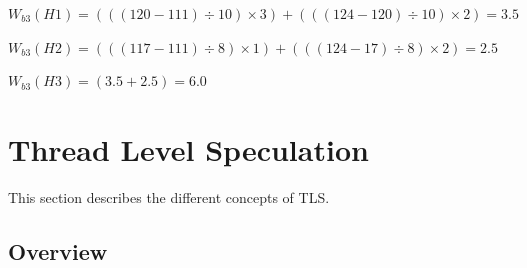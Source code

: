 \documentclass[10pt]{report}          %
\begin{document}
\begin{center}
$W_{b3}(H1) = (((120-111)\div 10)\times 3) + (((124-120)\div 10)\times 2)  = 3.5 $ \\
\end{center}
\begin{center}
$W_{b3}(H2) = (((117-111)\div 8)\times 1) + (((124-17)\div 8)\times 2)  = 2.5 $ \\
\end{center}
\begin{center}
$W_{b3}(H3) = (3.5 + 2.5) = 6.0$
\end{center}


  
\section{Thread Level Speculation}

This section describes the different concepts of TLS.
\label{sec:tls}

\subsection{Overview}
 
\end{document}
